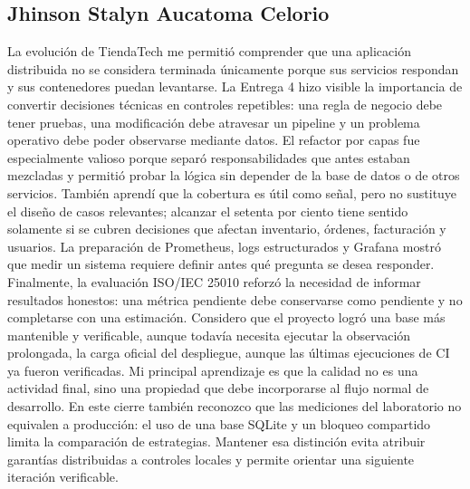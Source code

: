 \documentclass[12pt,a4paper]{article}
\begin{document}
\subsection{Jhinson Stalyn Aucatoma Celorio}
La evolución de TiendaTech me permitió comprender que una aplicación distribuida no se considera terminada únicamente porque sus servicios respondan y sus contenedores puedan levantarse. La Entrega 4 hizo visible la importancia de convertir decisiones técnicas en controles repetibles: una regla de negocio debe tener pruebas, una modificación debe atravesar un pipeline y un problema operativo debe poder observarse mediante datos. El refactor por capas fue especialmente valioso porque separó responsabilidades que antes estaban mezcladas y permitió probar la lógica sin depender de la base de datos o de otros servicios. También aprendí que la cobertura es útil como señal, pero no sustituye el diseño de casos relevantes; alcanzar el setenta por ciento tiene sentido solamente si se cubren decisiones que afectan inventario, órdenes, facturación y usuarios. La preparación de Prometheus, logs estructurados y Grafana mostró que medir un sistema requiere definir antes qué pregunta se desea responder. Finalmente, la evaluación ISO/IEC 25010 reforzó la necesidad de informar resultados honestos: una métrica pendiente debe conservarse como pendiente y no completarse con una estimación. Considero que el proyecto logró una base más mantenible y verificable, aunque todavía necesita ejecutar la observación prolongada, la carga oficial del despliegue, aunque las últimas ejecuciones de CI ya fueron verificadas. Mi principal aprendizaje es que la calidad no es una actividad final, sino una propiedad que debe incorporarse al flujo normal de desarrollo. En este cierre también reconozco que las mediciones del laboratorio no equivalen a producción: el uso de una base SQLite y un bloqueo compartido limita la comparación de estrategias. Mantener esa distinción evita atribuir garantías distribuidas a controles locales y permite orientar una siguiente iteración verificable.
\end{document}
